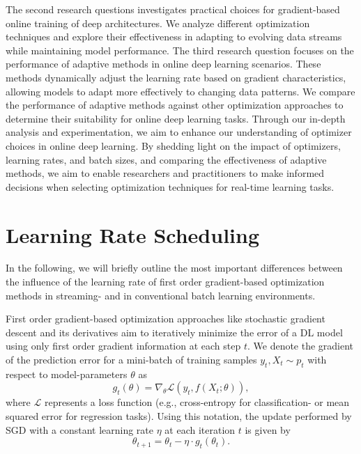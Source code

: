 \documentclass[letterpaper]{article} %
\begin{document}
The second research questions investigates practical choices for gradient-based online training of deep architectures.
We analyze different optimization techniques and explore their effectiveness in adapting to evolving data streams while maintaining model performance.
The third research question focuses on the performance of adaptive methods in online deep learning scenarios.
These methods dynamically adjust the learning rate based on gradient characteristics, allowing models to adapt more effectively to changing data patterns. We compare the performance of adaptive methods against other optimization approaches to determine their suitability for online deep learning tasks.
Through our in-depth analysis and experimentation, we aim to enhance our understanding of optimizer choices in online deep learning.
By shedding light on the impact of optimizers, learning rates, and batch sizes, and comparing the effectiveness of adaptive methods, we aim to enable researchers and practitioners to make informed decisions when selecting optimization techniques for real-time learning tasks.

\section{Learning Rate Scheduling}

In the following, we will briefly outline the most important differences between the influence of the learning rate of first order gradient-based optimization methods in streaming- and in conventional batch learning environments.

First order gradient-based optimization approaches like stochastic gradient descent and its derivatives aim to iteratively minimize the error of a DL model using only first order gradient information at each step $t$. We denote the gradient of the prediction error for a mini-batch of training samples $y_t, X_t \sim p_t$ with respect to model-parameters $\theta$ as
\begin{equation}
	g_t(\theta)   =   \nabla_{\theta} \mathcal{L}(y_t, f(X_t; \theta)),
\end{equation}
where $\mathcal{L}$ represents a loss function (e.g., cross-entropy for classification- or mean squared error for regression tasks). Using this notation, the update performed by SGD with a constant learning rate $\eta$ at each iteration $t$ is given by
\begin{equation}
	\theta_{t+1}  = \theta_{t} - \eta \cdot g_t(\theta_t).
\end{equation}
\end{document}
